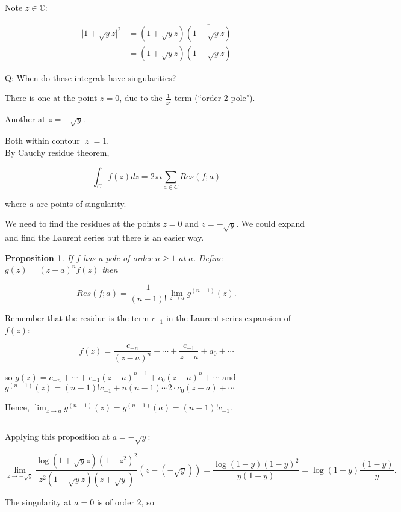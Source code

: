 \documentclass[twoside]{article}
\newcommand*\mean[1]{\bar{#1}}
\newtheorem{proposition}[theorem]{Proposition}
\newenvironment{proof}{{\bf Proof:}}{\hfill\rule{2mm}{2mm}}
\begin{document}
Note $z\in\mathbb{C}$:

\begin{equation}
	\begin{split}
		\lvert 1+\sqrt{y}z\rvert^2&=(1+\sqrt{y}z)\overline{(1+\sqrt{y}z)}\\
		&=(1+\sqrt{y}z)(1+\sqrt{y}\mean{z})
	\end{split}
\end{equation}

Q: When do these integrals have singularities?

There is one at the point $z=0$, due to the $\frac{1}{z^2}$ term (``order 2 pole").

Another at $z=-\sqrt{y}$.

Both within contour $\lvert z\rvert=1$.\\

By Cauchy residue theorem,

$$\int_C f(z)dz=2\pi i\sum_{a\in C}Res(f;a)$$

where $a$ are points of singularity.

We need to find the residues at the points $z=0$ and $z=-\sqrt{y}$. We could expand and find the Laurent series but there is an easier way.

\begin{proposition}
	If $f$ has a pole of order $n\geq 1$ at $a$. Define $g(z)=(z-a)^nf(z)$ then
	
	$$Res(f; a)=\frac{1}{(n-1)!}\lim_{z\to a}g^{(n-1)}(z).$$
\end{proposition}

\begin{proof}
	Remember that the residue is the term $c_{-1}$ in the Laurent series expansion of $f(z)$:
	
	$$f(z)=\frac{c_{-n}}{(z-a)^n}+\cdots +\frac{c_{-1}}{z-a}+a_0+\cdots$$
	
	so $g(z)=c_{-n}+\cdots +c_{-1}(z-a)^{n-1}+c_0(z-a)^n+\cdots$ and $g^{(n-1)}(z)=(n-1)!c_{-1}+n(n-1)\cdots2\cdot c_0(z-a)+\cdots$
	
	Hence, $\lim_{z\to a}g^{(n-1)}(z)=g^{(n-1)}(a)=(n-1)!c_{-1}.$
\end{proof}

Applying this proposition at $a=-\sqrt{y}$:

$$\lim_{z\to-\sqrt{y}}\frac{\log(1+\sqrt{y}z)(1-z^2)^2}{z^2(1+\sqrt{y}z)(z+\sqrt{y})}(z-(-\sqrt{y}))=\frac{\log(1-y)(1-y)^2}{y(1-y)}=\log(1-y)\frac{(1-y)}{y}.$$

The singularity at $a=0$ is of order 2, so
\end{document}
